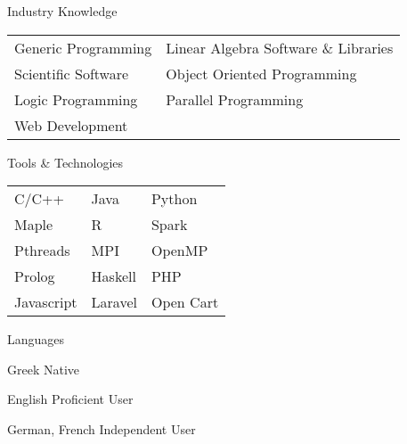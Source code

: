

\begin{cvskills}
	\bigskip
	\cvskill
	{Industry Knowledge} %
	{
		\begin{tabular}{l l}
			Generic Programming & Linear Algebra Software \& Libraries\\
			Scientific Software & Object Oriented Programming \\
			Logic Programming & Parallel Programming \\
			Web Development  &
		\end{tabular}	
}	
	\bigskip
  \cvskill
    {Tools \& Technologies} %
    {
    	\begin{tabular}{l l l}
    		C/C++ & Java & Python\\
    		Maple & R & Spark\\
    		Pthreads & MPI & OpenMP\\
    		Prolog & Haskell & PHP  \\
    		Javascript & Laravel & Open Cart		
    	\end{tabular}
} %

  \cvskill
    {Languages} %
    {
    	\begin{cvitems}
    		\item {Greek {\enskip\cdotp\enskip} Native}
    		\item {English {\enskip\cdotp\enskip} Proficient User}
    		\item {German, French {\enskip\cdotp\enskip} Independent User}
    	\end{cvitems}
    } %

\end{cvskills}
